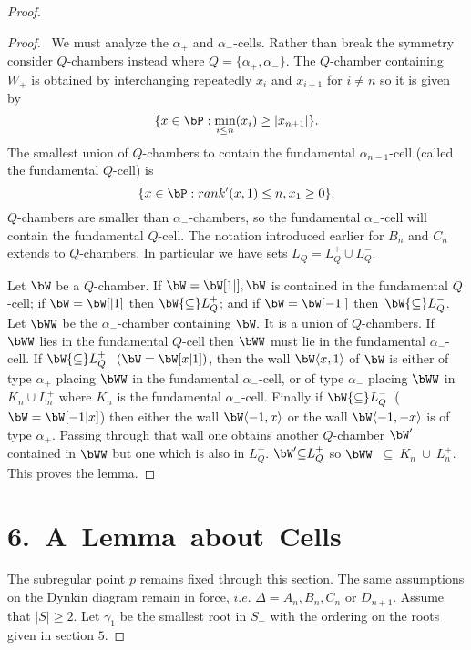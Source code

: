 \documentclass{memo-l}
\theoremstyle{definition}
\theoremstyle{remark}
\numberwithin{section}{chapter}
\numberwithin{equation}{chapter}
\begin{document}
\begin{proof}
\begin{proof} \  We must analyze the ${\alpha}_{+}$ and
${\alpha}_{-}$-cells.  Rather than break the symmetry consider $Q$-chambers
instead where $Q = \{{\alpha}_{+},{\alpha}_{-}\}$.  The $Q$-chamber
containing $W_{+}$ is obtained by interchanging repeatedly $x_{i}$ and
$x_{i+1}$ for $i \ne n$ so it is given by
$$
\{x  \in  \bP: \min_{i\le n}(x_i) \ge \vert x_{n+1}\vert\}.
$$
The smallest union of $Q$-chambers to contain the fundamental
${\alpha}_{n-1}$-cell (called the fundamental $Q$-cell) is
$$
\{x  \in  \bP: rank'(x,1) \le n, x_{1} \ge 0\}.
$$
$Q$-chambers are smaller than ${\alpha}_{-}$-chambers, so the fundamental
${\alpha}_{-}$-cell will contain the fundamental $Q$-cell.  The notation
introduced earlier for $B_{n}$ and $C_{n}$ extends to $Q$-chambers.  In
particular we have sets $L_{Q} = L_{Q}^{+} \cup L_{Q}^{-}$.
 
\medpagebreak

   Let ${\bW}$ be a $Q$-chamber.  If $\bW = \bW[1\vert ], 
\bW$ is contained in the fundamental $Q$-cell; if $\bW 
= \bW [\vert 1]$ then $\bW {\subseteq} L_{Q}^{+}$; and if 
$\bW = \bW [-1\vert ]$ then\ $\bW {\subseteq} L_{Q}^{-}$.  
Let $\bWW$ be the ${\alpha}_{-}$-chamber
containing $\bW.$ It is a union of $Q$-chambers.  If 
$\bWW$ lies in
the fundamental $Q$-cell then $\bWW$ must lie in the fundamental
${\alpha}_{-}$-cell.  If $\bW {\subseteq} L_{Q}^{+}$ $\ (\bW = 
\bW [x\vert 1])$, then the wall $\bW \langle x,1\rangle $ of ${\bW}$ 
is either of type ${\alpha}_{+}$ placing $\bWW$ 
in the fundamental ${\alpha}_{-}$-cell, or
of type ${\alpha}_{-}$ placing $\bWW$ in 
$K_{n} \cup L_{n}^{+}$ where $K_{n}$ is the fundamental
${\alpha}_{-}$-cell.  Finally if $\bW {\subseteq} L_{Q}^{-}$\ 
($\bW = \bW [-1\vert x]$) then either the wall 
$\bW \langle -1,x\rangle $ or the wall $\bW \langle -1,-x\rangle $ is of type ${\alpha}_{+}$.  
Passing through that wall one
obtains another $Q$-chamber $\bW'$ contained in 
$\bWW$ but one which
is also in $L_{Q}^{+}$.  $\bW' {\subseteq} L_{Q}^{+}$ so 
$\bWW$\ ${\subseteq}\ K_{n}\ \cup\ L_{n}^{+}$.  This
proves the lemma.
\end{proof} 

\section{6.\ A\ Lemma\ about\ Cells}
\medpagebreak

   The subregular point $p$ remains fixed through this section.  The same
assumptions on the Dynkin diagram remain in force, $i.e$.  ${\Delta} =
A_{n}, B_{n}, C_{n}$ or $D_{n+1}$.  Assume that $\vert S\vert \ge 2$.
Let ${\gamma}_{1}$ be the smallest root in $S_{-}$ with the ordering on the
roots given in section $5$.


\end{proof}
\end{document}
